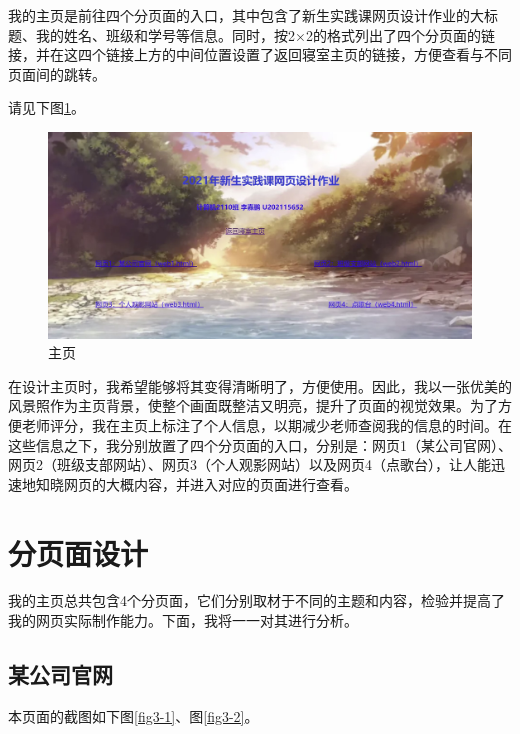 \documentclass[supercite]{Experimental_Report}
\theoremstyle{definition}
\begin{document}
	我的主页是前往四个分页面的入口，其中包含了新生实践课网页设计作业的大标题、我的姓名、班级和学号等信息。同时，按2×2的格式列出了四个分页面的链接，并在这四个链接上方的中间位置设置了返回寝室主页的链接，方便查看与不同页面间的跳转。
	
	请见下图\ref{fig2-1}。
	
	\begin{figure}[htb]
		\begin{center}
			\includegraphics[scale=0.50]{images/2-1.jpg}
			\caption{主页}
			\label{fig2-1}
		\end{center}
	\end{figure}
	
	在设计主页时，我希望能够将其变得清晰明了，方便使用。因此，我以一张优美的风景照作为主页背景，使整个画面既整洁又明亮，提升了页面的视觉效果。为了方便老师评分，我在主页上标注了个人信息，以期减少老师查阅我的信息的时间。在这些信息之下，我分别放置了四个分页面的入口，分别是：网页1（某公司官网）、网页2（班级支部网站）、网页3（个人观影网站）以及网页4（点歌台），让人能迅速地知晓网页的大概内容，并进入对应的页面进行查看。
	\newpage
	
	\section{分页面设计}
	
	我的主页总共包含4个分页面，它们分别取材于不同的主题和内容，检验并提高了我的网页实际制作能力。下面，我将一一对其进行分析。
	
	\subsection{某公司官网}
	
	本页面的截图如下图\ref{fig3-1}、图\ref{fig3-2}。
	
\end{document}
